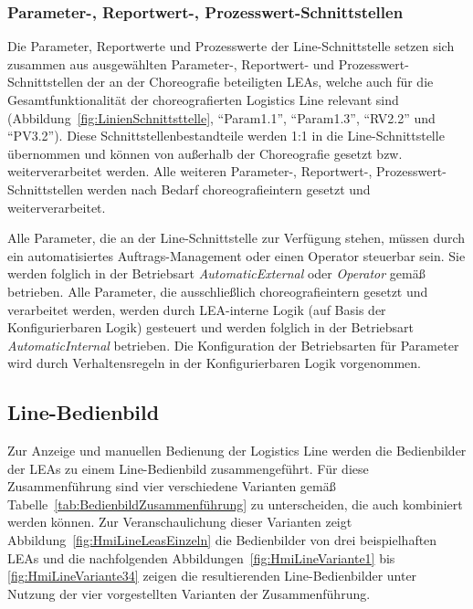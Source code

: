 \subsubsection{Parameter-, Reportwert-, Prozesswert-Schnittstellen}

Die Parameter, Reportwerte und Prozesswerte der Line-Schnittstelle setzen sich zusammen aus ausgewählten Parameter-, Reportwert- und Prozesswert-Schnittstellen der an der Choreografie beteiligten LEAs, welche auch für die Gesamtfunktionalität der choreografierten Logistics Line relevant sind (Abbildung~\ref{fig:LinienSchnittsttelle}, \enquote{Param1.1}, \enquote{Param1.3}, \enquote{RV2.2} und \enquote{PV3.2}). Diese Schnittstellenbestandteile werden 1:1 in die Line-Schnittstelle übernommen und können von außerhalb der Choreografie gesetzt bzw. weiterverarbeitet werden. Alle weiteren Parameter-, Reportwert-, Prozesswert-Schnittstellen werden nach Bedarf choreografieintern gesetzt und weiterverarbeitet. 

Alle Parameter, die an der Line-Schnittstelle zur Verfügung stehen, müssen durch ein automatisiertes Auftrags-Management oder einen Operator steuerbar sein. Sie werden folglich in der Betriebsart \emph{AutomaticExternal} oder \emph{Operator} gemäß \cite{PNO.2025.Part4} betrieben. Alle Parameter, die ausschließlich choreografieintern gesetzt und verarbeitet werden, werden durch LEA-interne Logik (auf Basis der Konfigurierbaren Logik) gesteuert und werden folglich in der Betriebsart \emph{Automatic\-Internal} betrieben. Die Konfiguration der Betriebsarten für Parameter wird durch Verhaltensregeln in der Konfigurierbaren Logik vorgenommen.

\subsection{Line-Bedienbild}
\label{subsec:LinienBedienbild}

Zur Anzeige und manuellen Bedienung der Logistics Line werden die Bedienbilder der LEAs zu einem Line-Bedienbild zusammengeführt. Für diese Zusammenführung sind vier verschiedene Varianten gemäß Tabelle~\ref{tab:BedienbildZusammenführung} zu unterscheiden, die auch kombiniert werden können. Zur Veranschaulichung dieser Varianten zeigt Abbildung~\ref{fig:HmiLineLeasEinzeln} die Bedienbilder von drei beispielhaften LEAs und die nachfolgenden Abbildungen~\ref{fig:HmiLineVariante1} bis \ref{fig:HmiLineVariante34} zeigen die resultierenden Line-Bedienbilder unter Nutzung der vier vorgestellten Varianten der Zusammenführung.

